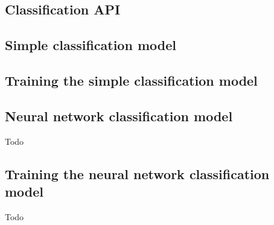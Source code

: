 \documentclass[../main.tex]{subfiles}
\begin{document}


\subsection{Classification API}


\subsection{Simple classification model}


\subsection{Training the simple classification model}


\subsection{Neural network classification model}
Todo

\subsection{Training the neural network classification model}
Todo
\end{document}
